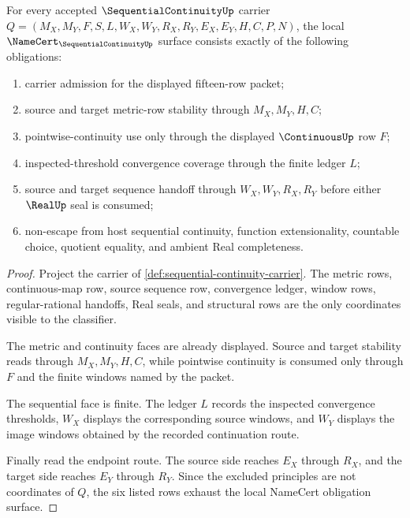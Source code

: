 \begin{theorem}
\label{thm:sequential-continuity-namecert-obligations}
For every accepted $\SequentialContinuityUp$ carrier $Q=(M_X,M_Y,F,S,L,W_X,W_Y,R_X,R_Y,E_X,E_Y,H,C,P,N)$, the local $\NameCert_{\SequentialContinuityUp}$ surface consists exactly of the following obligations:
\begin{enumerate}
\item carrier admission for the displayed fifteen-row packet;
\item source and target metric-row stability through $M_X,M_Y,H,C$;
\item pointwise-continuity use only through the displayed $\ContinuousUp$ row $F$;
\item inspected-threshold convergence coverage through the finite ledger $L$;
\item source and target sequence handoff through $W_X,W_Y,R_X,R_Y$ before either $\RealUp$ seal is consumed;
\item non-escape from host sequential continuity, function extensionality, countable choice, quotient equality, and ambient Real completeness.
\end{enumerate}
\end{theorem}
\begin{proof}
Project the carrier of \autoref{def:sequential-continuity-carrier}. The metric rows, continuous-map row, source sequence row, convergence ledger, window rows, regular-rational handoffs, Real seals, and structural rows are the only coordinates visible to the classifier.

The metric and continuity faces are already displayed. Source and target stability reads through $M_X,M_Y,H,C$, while pointwise continuity is consumed only through $F$ and the finite windows named by the packet.

The sequential face is finite. The ledger $L$ records the inspected convergence thresholds, $W_X$ displays the corresponding source windows, and $W_Y$ displays the image windows obtained by the recorded continuation route.

Finally read the endpoint route. The source side reaches $E_X$ through $R_X$, and the target side reaches $E_Y$ through $R_Y$. Since the excluded principles are not coordinates of $Q$, the six listed rows exhaust the local NameCert obligation surface.
\end{proof}

